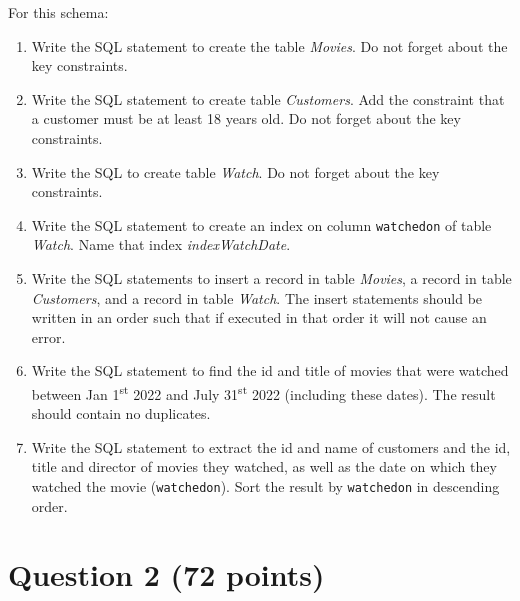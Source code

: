\documentclass[letterpaper, 11pt]{article}
\begin{document}
For this schema:
\begin{enumerate}[label={\alph*}),leftmargin=*]
    \item Write the SQL statement to create the table \textit{Movies}. Do not forget about the key constraints.
    \item Write the SQL statement to create table \textit{Customers}. Add the constraint that a customer must be at least 18 years old. Do not forget about the key constraints.
    \item Write the SQL to create table \textit{Watch}. Do not forget about the key constraints.
    \item Write the SQL statement to create an index on column \texttt{watchedon} of table \textit{Watch}. Name that index \textit{indexWatchDate}.
    \item Write the SQL statements to insert a record in table \textit{Movies}, a record in table \textit{Customers}, and a record in table \textit{Watch}. The insert statements should be written in an order such that if executed in that order it will not cause an error.
    \item Write the SQL statement to find the id and title of movies that were watched between Jan 1\textsuperscript{st} 2022 and July 31\textsuperscript{st} 2022 (including these dates). The result should contain no duplicates.
    \item Write the SQL statement to extract the id and name of customers and the id, title and director of movies they watched, as well as the date on which they watched the movie (\texttt{watchedon}). Sort the result by \texttt{watchedon} in descending order.
\end{enumerate}

\section*{Question 2 (72 points)}
\end{document}

